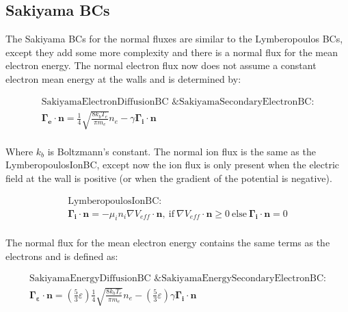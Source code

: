 \documentclass[final]{report}
\begin{document}
  \subsection{Sakiyama BCs}

  The Sakiyama BCs for the normal fluxes are similar to the Lymberopoulos BCs, except they add some more complexity and there is a normal flux for the mean electron energy. The normal electron flux now does not assume a constant electron mean energy at the walls and is determined by:

  \begin{equation}
  \begin{gathered}
      \text{SakiyamaElectronDiffusionBC \& SakiyamaSecondaryElectronBC:} \\
      \mathbf{\Gamma_{e}}\cdot\mathbf{n}=\frac{1}{4} \sqrt{\frac{8k_{b}T_{e}}{\pi m_{e}}} n_{e}-\gamma \mathbf{\Gamma_{i}}\cdot\mathbf{n}
  \end{gathered}
  \end{equation}
  \\
  Where $k_{b}$ is Boltzmann's constant. The normal ion flux is the same as the LymberopoulosIonBC, except now the ion flux is only present when the electric field at the wall is positive (or when the gradient of the potential is negative).

  \begin{equation}
  \begin{gathered}
      \text{LymberopoulosIonBC:} \\
      \mathbf{\Gamma_{i}}\cdot\mathbf{n}=-\mu_{i}n_{i}\nabla V_{eff}\cdot\mathbf{n}, \ \text{if} \ \nabla V_{eff}\cdot\mathbf{n}\geqslant0 \ \text{else} \ \mathbf{\Gamma_{i}}\cdot\mathbf{n}=0
  \end{gathered}
  \end{equation}
  \\
  The normal flux for the mean electron energy contains the same terms as the electrons and is defined as:

  \begin{equation}
  \begin{gathered}
      \text{SakiyamaEnergyDiffusionBC \& SakiyamaEnergySecondaryElectronBC:} \\
      \mathbf{\Gamma_{\varepsilon}}\cdot\mathbf{n}=\left(\frac{5}{3}\varepsilon\right)\frac{1}{4} \sqrt{\frac{8k_{b}T_{e}}{\pi m_{e}}} n_{e}-\left(\frac{5}{3}\varepsilon\right)\gamma \mathbf{\Gamma_{i}}\cdot\mathbf{n}
  \end{gathered}
  \end{equation}
\end{document}
